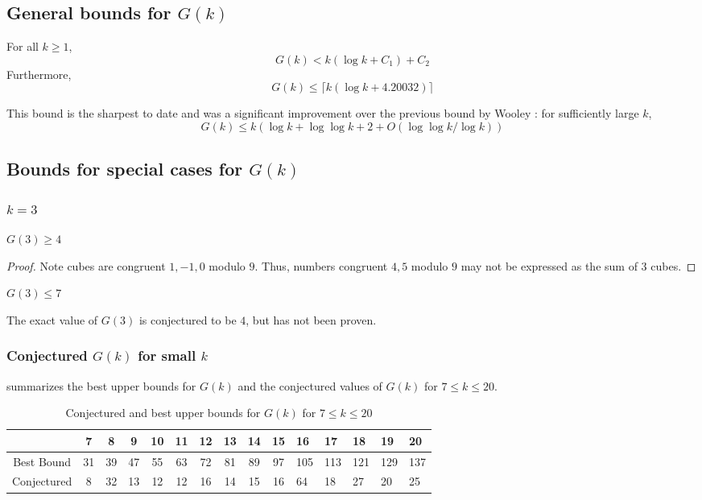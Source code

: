 \subsection{General bounds for $G(k)$}

\begin{theorem}
    For all $k\ge1$,
$$G(k)<k(\log k+C_1)+C_2$$
Furthermore,
$$G(k)\le\lceil k(\log k+4.20032)\rceil$$
\label{BW2022}
\end{theorem}

This bound is the sharpest to date and was a significant improvement over the previous bound by Wooley \cite{wooley_1992}: for sufficiently large $k$,
$$G(k)\le k(\log k+\log\log k+2+O(\log\log k/\log k))$$

\subsection{Bounds for special cases for $G(k)$}

\subsubsection{$k=3$}

\begin{lemma} $G(3)\ge4$
\end{lemma}
\begin{proof}
    Note cubes are congruent $1,-1,0$ modulo $9$. Thus, numbers congruent $4,5$ modulo $9$ may not be expressed as the sum of $3$ cubes.
\end{proof}


\begin{theorem} $G(3)\le7$\end{theorem}


The exact value of $G(3)$ is conjectured to be $4$, but has not been proven.

\subsubsection{Conjectured $G(k)$ for small $k$}

 summarizes the best upper bounds for $G(k)$ and the conjectured values of $G(k)$ for $7\le k\le 20$.


\begin{table}
    \centering
    \begin{tabular}{|c|c|c|c|c|c|c|c|c|c|l|l|l|l|l|}
        \hline
 & 7& 8& 9& 10& 11& 12& 13& 14&15 & 16& 17&  18&19&20\\
        \hline
         Best Bound&  31&  39&  47&  55&  63&  72&  81&  89&  97& 105& 113&  121&129&137\\
         \hline
         Conjectured&  8&  32&  13&  12&  12&  16&  14&  15&  16& 64& 18&  27&20&25\\
         \hline
    \end{tabular}
    \caption{Conjectured and best upper bounds for $G(k)$ for $7\le k\le 20$}
    \label{tab:Gkforsmallk}
\end{table}

